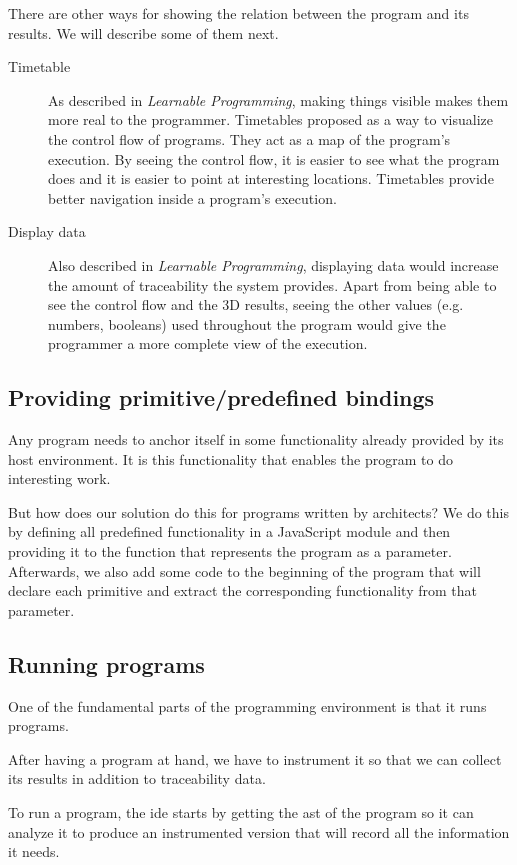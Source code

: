There are other ways for showing the relation between the program and its results.
We will describe some of them next.
\begin{description}
  \item[Timetable] As described in {\it Learnable Programming}, making things visible makes them more real to the programmer. Timetables proposed as a way to visualize the control flow of programs. They act as a map of the program's execution. By seeing the control flow, it is easier to see what the program does and it is easier to point at interesting locations. Timetables provide better navigation inside a program's execution.
  \item[Display data] Also described in {\it Learnable Programming}, displaying data would increase the amount of traceability the system provides. Apart from being able to see the control flow and the 3D results, seeing the other values (e.g. numbers, booleans) used throughout the program would give the programmer a more complete view of the execution.
\end{description}

\subsection{Providing primitive/predefined bindings}
\label{sub:provide:predefs}
Any program needs to anchor itself in some functionality already provided by its host environment.
It is this functionality that enables the program to do interesting work.

But how does our solution do this for programs written by architects?
We do this by defining all predefined functionality in a JavaScript module and then providing it to the function that represents the program as a parameter.
Afterwards, we also add some code to the beginning of the program that will declare each primitive and extract the corresponding functionality from that parameter.

\subsection{Running programs}
One of the fundamental parts of the programming environment is that it runs programs.

After having a program at hand, we have to instrument it so that we can collect its results in addition to traceability data.

To run a program, the \gls{ide} starts by getting the \gls{ast} of the program so it can analyze it to produce an instrumented version that will record all the information it needs.

